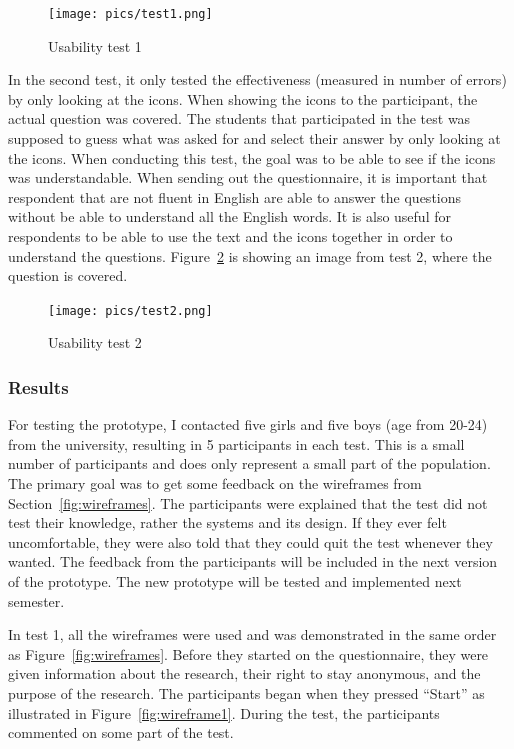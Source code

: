     \begin{figure}[H]
      \centering
      \texttt{[image: pics/test1.png]}
      \caption{Usability test 1}
      \label{fig:test1}
    \end{figure}

  In the second test, it only tested the effectiveness (measured in number of errors) by only looking at the icons. When showing the icons to the participant, the actual question was covered. The students that participated in the test was supposed to guess what was asked for and select their answer by only looking at the icons. When conducting this test, the goal was to be able to see if the icons was understandable. When sending out the questionnaire, it is important that respondent that are not fluent in English are able to answer the questions without be able to understand all the English words. It is also useful for respondents to be able to use the text and the icons together in order to understand the questions. Figure~\ref{fig:test2} is showing an image from test 2, where the question is covered. 

    \begin{figure}[H]
      \centering
      \texttt{[image: pics/test2.png]}
      \caption{Usability test 2}
      \label{fig:test2}
    \end{figure}

  \subsubsection*{Results}

  For testing the prototype, I contacted five girls and five boys (age from 20-24) from the university, resulting in 5 participants in each test. This is a small number of participants and does only represent a small part of the population. The primary goal was to get some feedback on the wireframes from Section~\ref{fig:wireframes}. The participants were explained that the test did not test their knowledge, rather the systems and its design. If they ever felt uncomfortable, they were also told that they could quit the test whenever they wanted. The feedback from the participants will be included in the next version of the prototype. The new prototype will be tested and implemented next semester.

  In test 1, all the wireframes were used and was demonstrated in the same order as Figure~\ref{fig:wireframes}. Before they started on the questionnaire, they were given information about the research, their right to stay anonymous, and the purpose of the research. The participants began when they pressed ``Start'' as illustrated in Figure~\ref{fig:wireframe1}. During the test, the participants commented on some part of the test.

